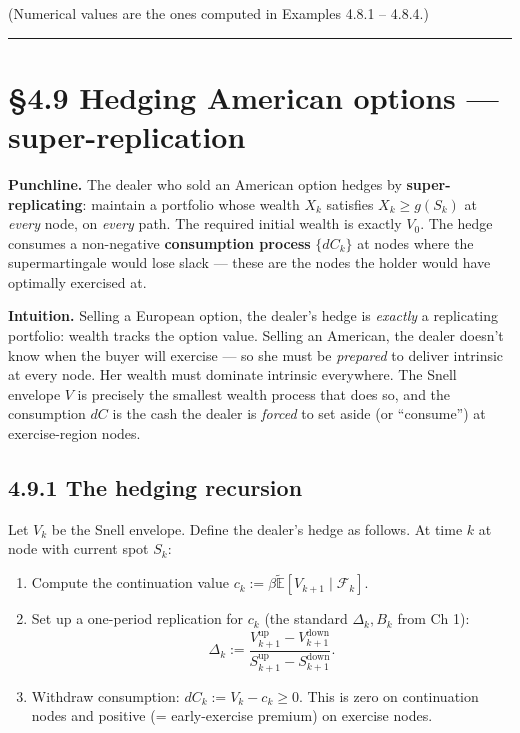 \documentclass[
  10pt,
  twoside]{book}
\providecommand{\tightlist}{%
  \setlength{\itemsep}{0pt}\setlength{\parskip}{0pt}}
\begin{document}
(Numerical values are the ones computed in Examples 4.8.1 -- 4.8.4.)

\begin{center}\rule{0.5\linewidth}{0.5pt}\end{center}

\section{§4.9 Hedging American options ---
super-replication}\label{hedging-american-options-super-replication}

\textbf{Punchline.} The dealer who sold an American option hedges by
\textbf{super-replicating}: maintain a portfolio whose wealth \(X_k\)
satisfies \(X_k \ge g(S_k)\) at \emph{every} node, on \emph{every} path.
The required initial wealth is exactly \(V_0\). The hedge consumes a
non-negative \textbf{consumption process} \(\{dC_k\}\) at nodes where
the supermartingale would lose slack --- these are the nodes the holder
would have optimally exercised at.

\textbf{Intuition.} Selling a European option, the dealer's hedge is
\emph{exactly} a replicating portfolio: wealth tracks the option value.
Selling an American, the dealer doesn't know when the buyer will
exercise --- so she must be \emph{prepared} to deliver intrinsic at
every node. Her wealth must dominate intrinsic everywhere. The Snell
envelope \(V\) is precisely the smallest wealth process that does so,
and the consumption \(dC\) is the cash the dealer is \emph{forced} to
set aside (or ``consume'') at exercise-region nodes.

\subsection{4.9.1 The hedging recursion}\label{the-hedging-recursion}

Let \(V_k\) be the Snell envelope. Define the dealer's hedge as follows.
At time \(k\) at node with current spot \(S_k\):

\begin{enumerate}
\def\labelenumi{\arabic{enumi}.}
\tightlist
\item
  Compute the continuation value
  \(c_k := \beta\tilde{\mathbb{E}}[V_{k+1}\mid\mathcal F_k]\).
\item
  Set up a one-period replication for \(c_k\) (the standard
  \(\Delta_k, B_k\) from Ch 1):
  \[\Delta_k := \frac{V_{k+1}^{\text{up}} - V_{k+1}^{\text{down}}}{S_{k+1}^{\text{up}} - S_{k+1}^{\text{down}}}.\]
\item
  Withdraw consumption: \(dC_k := V_k - c_k \ge 0\). This is zero on
  continuation nodes and positive (= early-exercise premium) on exercise
  nodes.
\end{enumerate}
\end{document}

